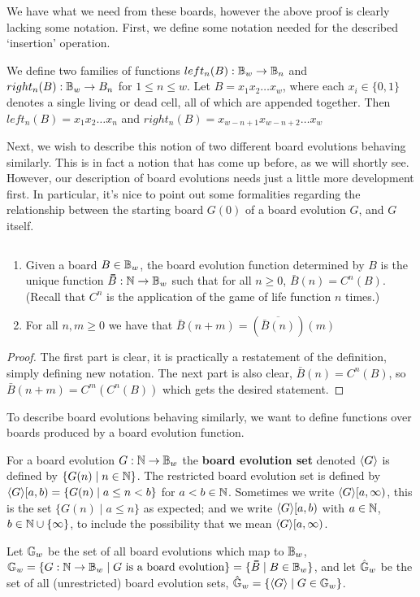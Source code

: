 \documentclass[12pt,letterpaper]{article}
\begin{document}
We have what we need from these boards, however the above proof is clearly lacking some notation. First, we define some notation needed for the described `insertion' operation.
\begin{dfn}\label{getPartBoard}
  We define two families of functions $left_n(B):\mathbb{B}_w\rightarrow \mathbb{B}_{n}$ and $right_n(B):\mathbb{B}_w\rightarrow B_n$ for $1\leq n\leq w$. Let $B=x_1x_2\dots x_w$, where each $x_i\in\{0,1\}$ denotes a single living or dead cell, all of which are appended together. Then $left_n(B)=x_1x_2\dots x_n$ and $right_n(B)=x_{w-n+1}x_{w-n+2}\dots x_w$
\end{dfn}

Next, we wish to describe this notion of two different board evolutions behaving similarly. This is in fact a notion that has come up before, as we will shortly see. However, our description of board evolutions needs just a little more development first. In particular, it's nice to point out some formalities regarding the relationship between the starting board $G(0)$ of a board evolution $G$, and $G$ itself.

\begin{prop}\label{BoardDeterminesEvolution}
  $\,$
  \begin{enumerate}[label=(\alph*)]
    \item Given a board $B\in\mathbb{B}_w$, the board evolution function determined by $B$ is the unique function $\bar{B}: \N\rightarrow \B_w$ such that for all $n\geq 0$, $\bar{B}(n)=C^n(B)$. (Recall that $C^n$ is the application of the game of life function $n$ times.)
    \item For all $n,m\geq 0$ we have that $\bar B(n+m)=(\overline{\bar B(n)})(m)$
  \end{enumerate}
\end{prop}
\begin{proof}
  The first part is clear, it is practically a restatement of the definition, simply defining new notation. The next part is also clear, $\bar{B}(n)=C^n(B)$, so $\bar B(n+m) = C^m(C^n(B))$ which gets the desired statement.
\end{proof}

To describe board evolutions behaving similarly, we want to define functions over boards produced by a board evolution function.
\begin{dfn}\label{boardEvolutionSet}
  For a board evolution $G:\mathbb{N}\rightarrow \mathbb{B}_w$ the {\bf board evolution set} denoted $\langle G\rangle$ is defined by $\{G(n)\;|\; n\in \mathbb{N}\}$. The restricted board evolution set is defined by $\langle G\rangle[a,b) = \{G(n)\;|\; a\leq n < b\}$ for $a<b\in \mathbb{N}$. Sometimes we write $\langle G\rangle[a,\infty)$, this is the set $\{G(n)\;|\; a\leq n\}$ as expected; and we write $\langle G\rangle[a,b)$ with $a\in \mathbb{N}$, $b\in \mathbb{N}\cup\{\infty\}$, to include the possibility that we mean $\langle G\rangle[a,\infty)$.

  Let $\mathbb{G}_w$ be the set of all board evolutions which map to $\mathbb{B}_w$, $\G_w=\{G:\N\rightarrow \B_w\;|\;\allowbreak G \text{ is a board evolution}\}=\{\bar B\;|\; B\in \B_w\}$, and let $\hat {\mathbb{G}}_w$ be the set of all (unrestricted) board evolution sets, $\hat {\mathbb{G}}_w = \{\langle G\rangle \;|\; G\in \mathbb{G}_w\}$. 
\end{dfn}
\end{document}

